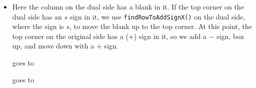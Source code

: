 \documentclass[12pt]{article}
\numberwithin{equation}{section}
\newcommand{\horizontalDominoRSShift}[4]{\filldraw [dominoRSStyle] (#2 - 1 + #4 + \eps, #1 - 1 + \eps) rectangle + (2 - \teps, 1 -\teps) node [dominoText] {$#3$};}
\newcommand{\verticalDominoRSShift}[4]{\filldraw [dominoRSStyle] (#2 - 1 + #4 + \eps,  #1 - 1 + \eps) rectangle + (1 - \teps,2 -\teps) node [dominoText] {$#3$};}
\begin{document}
\begin{itemize}
\begin{itemize}
      \item Here the column on the dual side has a blank in it.
      If the top corner on the dual side has an $s$ sign in it, we use \texttt{findRowToAddSignX()} on the dual side, where the sign is $s$, to move the blank up to the top corner.
      At this point, the top corner on the original side has a ($+$) sign in it, so we add a $-$ sign, box up, and move down with a $+$ sign.
      \begin{figure}[H]
        \centering
      \end{figure}
      goes to
      \begin{figure}[H]
        \centering
      \end{figure}
      goes to
      \begin{figure}[H]
        \centering

\end{figure}
\end{itemize}
\end{itemize}
\end{document}
